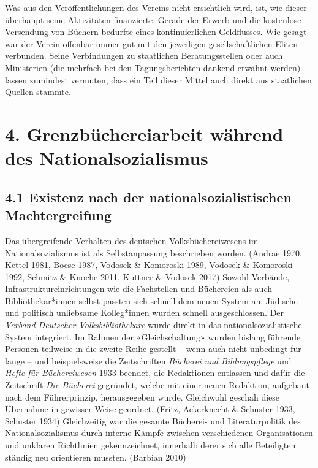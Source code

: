 \documentclass[a4paper,
fontsize=11pt,
oneside,
numbers=noperiodatend,
parskip=half-,
bibliography=totoc,
final
]{scrartcl}
\begin{document}
Was aus den Veröffentlichungen des Vereins nicht ersichtlich wird, ist,
wie dieser überhaupt seine Aktivitäten finanzierte. Gerade der Erwerb
und die kostenlose Versendung von Büchern bedurfte eines
kontinuierlichen Geldflusses. Wie gesagt war der Verein offenbar immer
gut mit den jeweiligen gesellschaftlichen Eliten verbunden. Seine
Verbindungen zu staatlichen Beratungsstellen oder auch Ministerien (die
mehrfach bei den Tagungsberichten dankend erwähnt werden) lassen
zumindest vermuten, dass ein Teil dieser Mittel auch direkt aus
staatlichen Quellen stammte.

\hypertarget{grenzbuxfcchereiarbeit-wuxe4hrend-des-nationalsozialismus}{%
\section{4. Grenzbüchereiarbeit während des
Nationalsozialismus}\label{grenzbuxfcchereiarbeit-wuxe4hrend-des-nationalsozialismus}}

\hypertarget{existenz-nach-der-nationalsozialistischen-machtergreifung}{%
\subsection{4.1 Existenz nach der nationalsozialistischen
Machtergreifung}\label{existenz-nach-der-nationalsozialistischen-machtergreifung}}

Das übergreifende Verhalten des deutschen Volksbüchereiwesens im
Nationalsozialismus ist als Selbstanpassung beschrieben worden. (Andrae
1970, Kettel 1981, Boese 1987, Vodosek \& Komoroski 1989, Vodosek \&
Komoroski 1992, Schmitz \& Knoche 2011, Kuttner \& Vodosek 2017) Sowohl
Verbände, Infrastruktureinrichtungen wie die Fachstellen und Büchereien
als auch Bibliothekar*innen selbst passten sich schnell dem neuen System
an. Jüdische und politisch unliebsame Kolleg*innen wurden schnell
ausgeschlossen. Der \emph{Verband Deutscher Volksbibliothekare} wurde
direkt in das nationalsozialistische System integriert. Im Rahmen der
«Gleichschaltung» wurden bislang führende Personen teilweise in die
zweite Reihe gestellt -- wenn auch nicht unbedingt für lange -- und
beispielsweise die Zeitschriften \emph{Bücherei und Bildungspflege} und
\emph{Hefte für Büchereiwesen} 1933 beendet, die Redaktionen entlassen
und dafür die Zeitschrift \emph{Die Bücherei} gegründet, welche mit
einer neuen Redaktion, aufgebaut nach dem Führerprinzip, herausgegeben
wurde. Gleichwohl geschah diese Übernahme in gewisser Weise geordnet.
(Fritz, Ackerknecht \& Schuster 1933, Schuster 1934) Gleichzeitig war
die gesamte Bücherei- und Literaturpolitik des Nationalsozialismus durch
interne Kämpfe zwischen verschiedenen Organisationen und unklaren
Richtlinien gekennzeichnet, innerhalb derer sich alle Beteiligten
ständig neu orientieren mussten. (Barbian 2010)
\end{document}
